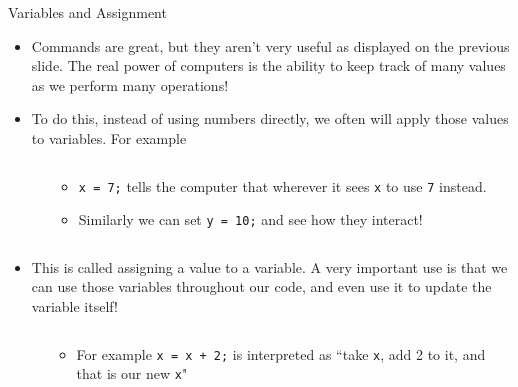 {}\documentclass[letterpaper,
compress,
xcolor=x11names,
]{beamer}
\begin{document}
\begin{frame}{Variables and Assignment}
	\footnotesize
	\begin{itemize}
		\item Commands are great, but they aren't very useful as displayed on the previous slide. The real power of computers is the ability to keep track of many values as we perform many operations!
		\item<2-> To do this, instead of using numbers directly, we often will apply those values to variables. For example
		\begin{columns}
			\begin{column}{0.05\linewidth}
			\end{column}
			\begin{column}{0.65\linewidth}
				\scriptsize
				\begin{itemize}
					\item \texttt{x = 7;} tells the computer that wherever it sees \texttt{x} to use \texttt{7} instead.
					\item Similarly we can set \texttt{y = 10;} and see how they interact!
				\end{itemize}
			\end{column}
			\begin{column}{0.3\linewidth}
				\begin{center}
				\end{center}
			\end{column}
		\end{columns}
		\item<3-> This is called assigning a value to a variable. A very important use is that we can use those variables throughout our code, and even use it to update the variable itself!
		\begin{columns}
			\begin{column}{0.05\linewidth}
			\end{column}
			\begin{column}{0.65\linewidth}
				\scriptsize
				\begin{itemize}
					\item<3-> For example \texttt{x = x + 2;} is interpreted as ``take \texttt{x}, add 2 to it, and that is our new \texttt{x}"

\end{itemize}
\end{column}
\end{columns}
\end{itemize}
\end{frame}
\end{document}
